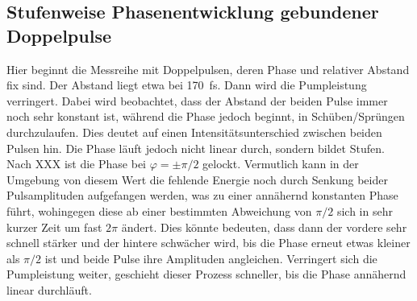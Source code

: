 \documentclass[bachelor,       %
               twoside,        %
               BCOR10mm,       %
               english,ngerman, %
               ]{GAUBM}
\begin{document}
\subsection{Stufenweise Phasenentwicklung gebundener Doppelpulse}
Hier beginnt die Messreihe mit Doppelpulsen, deren Phase und relativer Abstand fix sind.
Der Abstand liegt etwa bei 170 \,fs.
Dann wird die Pumpleistung verringert.
Dabei wird beobachtet, dass der Abstand der beiden Pulse immer noch sehr konstant ist, während die Phase jedoch beginnt, in Schüben/Sprüngen durchzulaufen.
Dies deutet auf einen Intensitätsunterschied zwischen beiden Pulsen hin.
Die Phase läuft jedoch nicht linear durch, sondern bildet Stufen.
Nach XXX ist die Phase bei $\varphi=\pm\pi/2$ gelockt.
Vermutlich kann in der Umgebung von diesem Wert die fehlende Energie noch durch Senkung beider Pulsamplituden aufgefangen werden, was zu einer annähernd konstanten Phase führt, wohingegen diese ab einer bestimmten Abweichung von $\pi/2$ sich in sehr kurzer Zeit um fast $2\pi$ ändert.
Dies könnte bedeuten, dass dann der vordere sehr schnell stärker und der hintere schwächer wird, bis die Phase erneut etwas kleiner als $\pi/2$ ist und beide Pulse ihre Amplituden angleichen.
Verringert sich die Pumpleistung weiter, geschieht dieser Prozess schneller, bis die Phase annähernd linear durchläuft.
\end{document}
